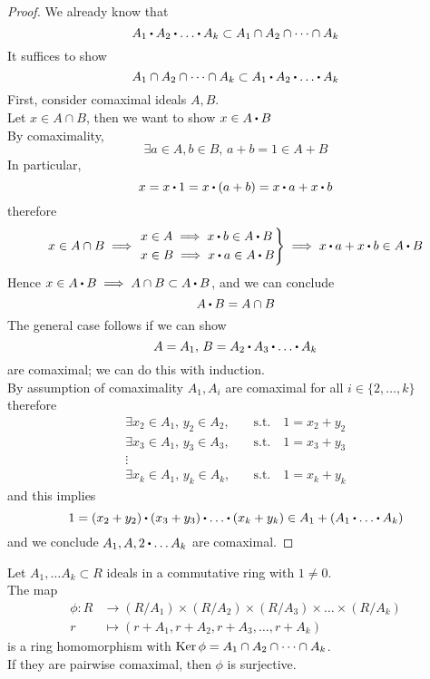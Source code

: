 \documentclass[../Main.tex]{subfiles}
\begin{document}
\begin{proof}
	We already know that
	\[A_1\rdot A_2\rdot \dots \rdot A_k \subset A_1 \cap A_2 \cap \dots \cap A_k\]
	It suffices to show 
	\[A_1 \cap A_2 \cap \dots \cap A_k \subset A_1\rdot A_2\rdot \dots \rdot A_k \]
	First, consider comaximal ideals $A,B$.\\
	Let $x\in A\cap B$, then we want to show $x\in A\rdot B$\\
	By comaximality,
	\[\exists a\in A, b\in B, \, a+b =1 \in A+B\]
	In particular,
	\[x=x\rdot 1=x\rdot (a+b)=x\rdot a+x\rdot b\]
	therefore
	\[x\in A\cap B \implies \begin{rcases}
	x\in A \implies x\rdot b\in A\rdot B\\
	x\in B\implies x\rdot a \in A\rdot B
	\end{rcases}\implies x\rdot a+x\rdot b\in A\rdot B\]
	Hence $x\in A\rdot B \implies A\cap B \subset A\rdot B$, and we can conclude
	\[A\rdot B = A\cap B\]
	The general case follows if we can show 
	\[A=A_1,\, B=A_2\rdot A_3\rdot \dots\rdot A_k\]
	are comaximal; we can do this with induction.\\
	By assumption of comaximality $A_1,A_i$ are comaximal for all $i\in \{2,\dots,k\}$
	therefore
	\begin{align*}
		\exists x_2\in A_1,\, y_2\in A_2,\quad  &\text{s.t.} \quad 1=x_2+y_2\\\exists x_3\in A_1,\, y_3\in A_3,\quad  &\text{s.t.} \quad 1=x_3+y_3\\
		\vdots&\\
		\exists x_k\in A_1,\, y_k\in A_k,\quad  &\text{s.t.} \quad 1=x_k+y_k
	\end{align*}
	and this implies
	\[1=(x_2+y_2)\rdot (x_3+y_3)\rdot \dots\rdot (x_k+y_k)\in A_1+(A_1\rdot \dots \rdot A_k)\]
	and we conclude $A_1, A,2\rdot \dots A_k$ are comaximal.
\end{proof}
\begin{thm}[title=Chinese Remainder Theorem]
	Let $A_1,\dots A_k\subset R$ ideals in a commutative ring with $1\ne 0$.\\
	The map
	\begin{align*}
	\phi\colon R&\to (R/A_1)\times (R/A_2)\times (R/A_3)\times\dots\times(R/A_k)\\
	r&\mapsto (r+A_1,r+A_2,r+A_3,\dots,r+A_k)
	\end{align*}
	is a ring homomorphism with $\operatorname{Ker}\phi = A_1\cap A_2\cap \dots \cap A_k$.\\
	If they are pairwise comaximal, then $\phi$ is surjective.
\end{thm}
\end{document}

